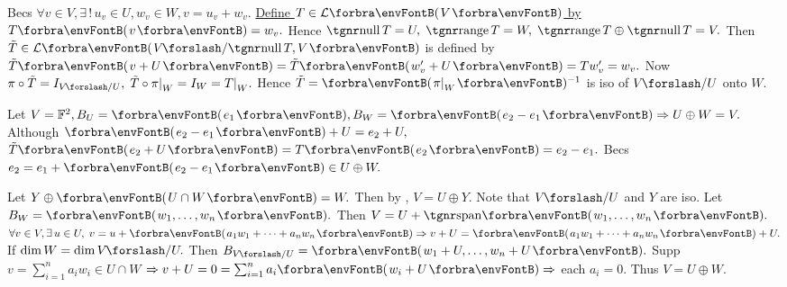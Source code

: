 \BulletPointX\NoteFor{[3.88, 3.90, 3.91]}\;\TextB{}
{Becs $\forall v\in V,\exists\,!\,u_v\in U,w_v\in W,v=u_v+w_v.$ \uline{Define $T\in\Lm{V}$ by $T\Par{v}=w_v.$}}\TextB{}
{Hence $\null T=U,\;\range T=W,\;\range T\oplus\null T=V.$}\TextB{}
{Then $\tilde{T}\in\Lm{V\XSlash \null T,V}$ is defined by $\tilde{T}\Par{v+U}=\tilde{T}\Par{w_v'+U}=Tw_v'=w_v.$ \FontSmall{}}\TextB{}
{Now $\pi\circ\tilde{T}=I_{V\XSlash U},\;\tilde{T}\circ\pi\mmid_W=I_{W}=T\mmid_W.$ \;Hence $\tilde{T}=\Par{\pi\mmid_W}{^{-1}}$ is iso of $V\XSlash U$ onto $W.$}\par\vspace{2pt}
\BulletPointX\AExa Let $V=\Fbb^2,B_U=\Par{e_1},B_W=\Par{e_2-e_1}\Rightarrow U\oplus W=V.$\TextE{}
Although $\Par{e_2-e_1}+U=e_2+U,$ $\tilde{T}\Par{e_2+U}=T\Par{e_2}=e_2-e_1.$ Becs $e_2=e_1+\Par{e_2-e_1}\in U\oplus W.$
\SepLine

Let $Y\oplus\Par{U\cap W}=W.$ Then by , $V=U\oplus Y.$ Note that $V\XSlash U$ and $Y$ are iso.\PfEnd\parSol{\vspace{2pt}}
\Or Let $B_W=\Par{w_1,\dots,w_n}.$ Then $V=U+\Span{w_1,\dots,w_n}.$\parSol{}
$\forall v\in V,\exists\,u\in U,\;v=u+\Par{a_1w_1+\dots+a_nw_n}\Rightarrow v+U=\Par{a_1w_1+\dots+a_nw_n}+U.$\PfEnd\vspace{2pt}
\ANote If $\dim W=\dim V\XSlash U.$ Then $B_{V\XSlash U}=\Par{w_1+U,\dots,w_n+U}.$ Supp $v=\sum_{i=1}^na_iw_i\in U\cap W$\parNot
$\Rightarrow v+U=0=\sum_{i=1}^na_i\Par{w_i+U}\Rightarrow$ each $a_i=0.$ Thus $V=U\oplus W.$
\SepLine

